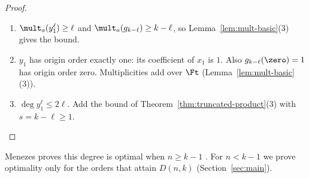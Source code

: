 \begin{proof}
\begin{enumerate}
 \item \(\mult_a(y_1^\ell)\ge\ell\) and \(\mult_a(g_{k-\ell})\ge k-\ell\), so
 Lemma~\ref{lem:mult-basic}(3) gives the bound.
 \item \(y_1\) has origin order exactly one: its coefficient of \(x_1\) is \(1\).
 Also \(g_{k-\ell}(\zero)=1\) has origin order zero. Multiplicities add over
 \(\Ft\) (Lemma~\ref{lem:mult-basic}(3)).
 \item \(\deg y_1^\ell\le2\ell\). Add the bound of
 Theorem~\ref{thm:truncated-product}(3) with \(s=k-\ell\ge1\). \qedhere
\end{enumerate}
\end{proof}

Menezes proves this degree is optimal when \(n\ge k-1\) \cite[Corollary~1.3]{Men26}.
For \(n<k-1\) we prove optimality only for the orders that attain \(D(n,k)\)
(Section~\ref{sec:main}).
